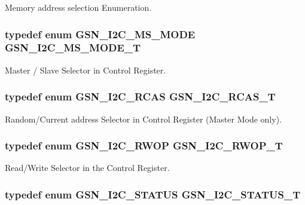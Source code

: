 Memory address selection Enumeration. 

\hypertarget{a00649_ga72605883ea904f4ee6c310a25142a0ab}{
\subsubsection[{GSN\_\-I2C\_\-MS\_\-MODE\_\-T}]{\setlength{\rightskip}{0pt plus 5cm}typedef enum {\bf GSN\_\-I2C\_\-MS\_\-MODE}  {\bf GSN\_\-I2C\_\-MS\_\-MODE\_\-T}}}
\label{a00649_ga72605883ea904f4ee6c310a25142a0ab}


Master / Slave Selector in Control Register. 

\hypertarget{a00649_ga3e0976c06462690937465a53a0c38cc4}{
\subsubsection[{GSN\_\-I2C\_\-RCAS\_\-T}]{\setlength{\rightskip}{0pt plus 5cm}typedef enum {\bf GSN\_\-I2C\_\-RCAS}  {\bf GSN\_\-I2C\_\-RCAS\_\-T}}}
\label{a00649_ga3e0976c06462690937465a53a0c38cc4}


Random/Current address Selector in Control Register (Master Mode only). 

\hypertarget{a00649_ga0789ba469961beef75b0187cc554d801}{
\subsubsection[{GSN\_\-I2C\_\-RWOP\_\-T}]{\setlength{\rightskip}{0pt plus 5cm}typedef enum {\bf GSN\_\-I2C\_\-RWOP}  {\bf GSN\_\-I2C\_\-RWOP\_\-T}}}
\label{a00649_ga0789ba469961beef75b0187cc554d801}


Read/Write Selector in the Control Register. 

\hypertarget{a00649_ga9787fba32c156c866916dc301e5727c8}{
\subsubsection[{GSN\_\-I2C\_\-STATUS\_\-T}]{\setlength{\rightskip}{0pt plus 5cm}typedef enum {\bf GSN\_\-I2C\_\-STATUS}  {\bf GSN\_\-I2C\_\-STATUS\_\-T}}}
\label{a00649_ga9787fba32c156c866916dc301e5727c8}


